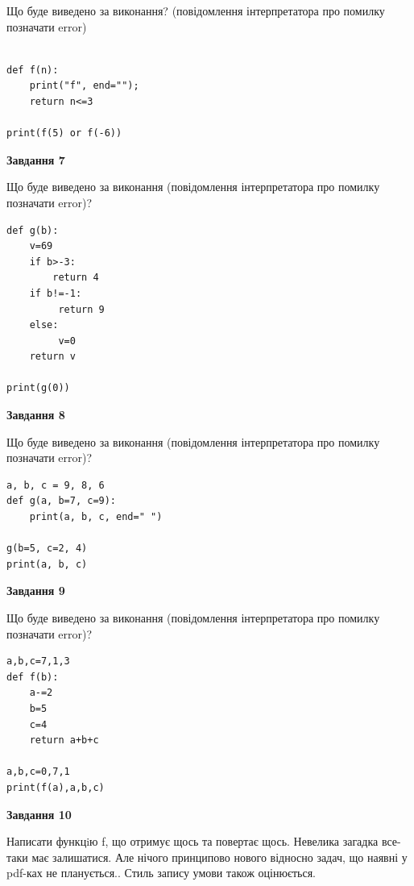\documentclass[12pt, ukrainian]{article}
\begin{document}
{\begin {large}
Що буде виведено за виконання? (повідомлення інтерпретатора про помилку позначати error)\par
\begin{verbatim}

def f(n):
    print("f", end="");
    return n<=3

print(f(5) or f(-6))
\end{verbatim}

{\begin {center}\textbf{Завдання 7}\end {center}}

Що буде виведено за виконання (повідомлення інтерпретатора про помилку позначати error)?\par
\begin{verbatim}
def g(b):
    v=69
    if b>-3: 
        return 4
    if b!=-1:
         return 9
    else:
         v=0
    return v

print(g(0))
\end{verbatim}

{\begin {center}\textbf{Завдання 8}\end {center}}

Що буде виведено за виконання (повідомлення інтерпретатора про помилку позначати error)?\par
\begin{verbatim}
a, b, c = 9, 8, 6
def g(a, b=7, c=9):
    print(a, b, c, end=" ")

g(b=5, c=2, 4)
print(a, b, c)
\end{verbatim}

{\begin {center}\textbf{Завдання 9}\end {center}}

Що буде виведено за виконання (повідомлення інтерпретатора про помилку позначати error)?\par
\begin{verbatim}
a,b,c=7,1,3
def f(b):
    a-=2
    b=5
    c=4
    return a+b+c

a,b,c=0,7,1
print(f(a),a,b,c)
\end{verbatim}

{\begin {center}\textbf{Завдання 10}\end {center}}


Написати функцiю f, що отримує щось та повертає щось. Невелика загадка все-таки має залишатися. Але нічого принципово нового відносно задач, що наявні у pdf-ках не планується.. Стиль запису умови також оцінюється.\par
\end {large}}
\newpage
\end{document}
